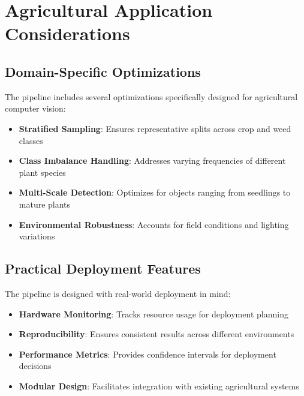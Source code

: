 \section{Agricultural Application Considerations}
\subsection{Domain-Specific Optimizations}

The pipeline includes several optimizations specifically designed for agricultural computer vision:

\begin{itemize}
    \item \textbf{Stratified Sampling}: Ensures representative splits across crop and weed classes
    \item \textbf{Class Imbalance Handling}: Addresses varying frequencies of different plant species
    \item \textbf{Multi-Scale Detection}: Optimizes for objects ranging from seedlings to mature plants
    \item \textbf{Environmental Robustness}: Accounts for field conditions and lighting variations
\end{itemize}

\subsection{Practical Deployment Features}

The pipeline is designed with real-world deployment in mind:

\begin{itemize}
    \item \textbf{Hardware Monitoring}: Tracks resource usage for deployment planning
    \item \textbf{Reproducibility}: Ensures consistent results across different environments
    \item \textbf{Performance Metrics}: Provides confidence intervals for deployment decisions
    \item \textbf{Modular Design}: Facilitates integration with existing agricultural systems
\end{itemize}
